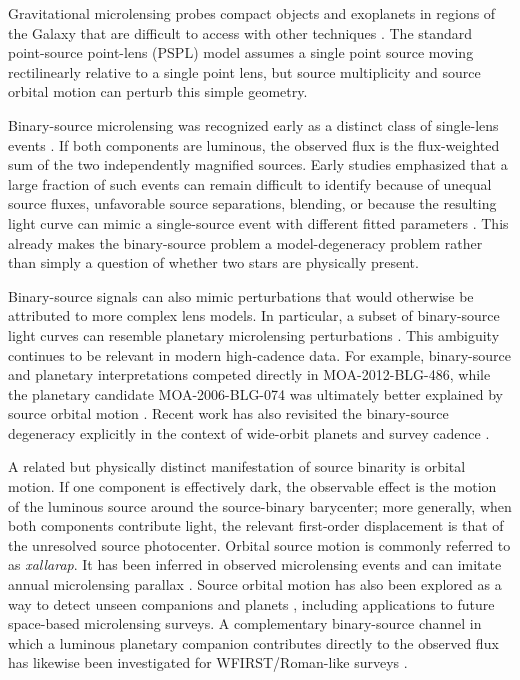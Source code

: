 \documentclass{article}
\begin{document}
Gravitational microlensing probes compact objects and exoplanets in
regions of the Galaxy that are difficult to access with other
techniques \citep{MaoPaczynski1991,BennettRhie1996}. The standard
point-source point-lens (PSPL) model assumes a single point source moving
rectilinearly relative to a single point lens, but source multiplicity
and source orbital motion can perturb this simple geometry.

Binary-source microlensing was recognized early as a distinct class of
single-lens events \citep{GriestHu1992}. If both components are
luminous, the observed flux is the flux-weighted sum of the two
independently magnified sources. Early studies emphasized that a large
fraction of such events can remain difficult to identify because of
unequal source fluxes, unfavorable source separations, blending, or
because the resulting light curve can mimic a single-source event with
different fitted parameters
\citep{1998A&A...333..893D,HanJeong1998}. This already makes the
binary-source problem a model-degeneracy problem rather than simply a
question of whether two stars are physically present.

Binary-source signals can also mimic perturbations that would otherwise
be attributed to more complex lens models. In particular, a subset of
binary-source light curves can resemble planetary microlensing
perturbations \citep{Gaudi1998,2002ApJ...564.1015H}. This ambiguity
continues to be relevant in modern high-cadence data. For example,
binary-source and planetary interpretations competed directly in
MOA-2012-BLG-486, while the planetary candidate MOA-2006-BLG-074 was
ultimately better explained by source orbital motion
\citep{Hwang2013,2021AJ....162...59R}. Recent work has also revisited
the binary-source degeneracy explicitly in the context of wide-orbit
planets and survey cadence \citep{2025AJ....170..141S}.

A related but physically distinct manifestation of source binarity is
orbital motion. If one component is effectively dark, the observable
effect is the motion of the luminous source around the source-binary
barycenter; more generally, when both components contribute light, the
relevant first-order displacement is that of the unresolved source
photocenter. Orbital source motion is commonly referred to as
\emph{xallarap}. It has been inferred in observed microlensing events
\citep{Alcock2001} and can imitate annual microlensing parallax
\citep{Poindexter2005}. Source orbital motion has also been explored as
a way to detect unseen companions and planets
\citep{RahvarDominik2009,Miyazaki2021}, including applications to
future space-based microlensing surveys. A complementary binary-source
channel in which a luminous planetary companion contributes directly to
the observed flux has likewise been investigated for WFIRST/Roman-like
surveys \citep{2019MNRAS.490.1581B}.
\end{document}
